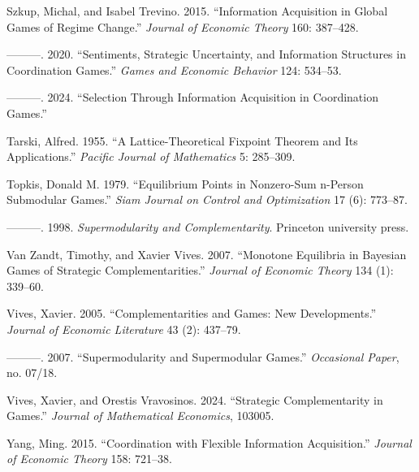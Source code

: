 \documentclass[
]{article}
\newlength{\cslhangindent}
\newenvironment{CSLReferences}[2] %
 {\begin{list}{}{%
  \setlength{\itemindent}{0pt}
  \setlength{\leftmargin}{0pt}
  \setlength{\parsep}{0pt}
  \ifodd #1
   \setlength{\leftmargin}{\cslhangindent}
   \setlength{\itemindent}{-1\cslhangindent}
  \fi
  \setlength{\itemsep}{#2\baselineskip}}}
 {\end{list}}
\theoremstyle{definition}
\theoremstyle{plain}
\theoremstyle{remark}
\begin{document}
\begin{CSLReferences}{1}{0}
Szkup, Michal, and Isabel Trevino. 2015. {``Information Acquisition in
Global Games of Regime Change.''} \emph{Journal of Economic Theory} 160:
387--428.

---------. 2020. {``Sentiments, Strategic Uncertainty, and Information
Structures in Coordination Games.''} \emph{Games and Economic Behavior}
124: 534--53.

---------. 2024. {``Selection Through Information Acquisition in
Coordination Games.''}

Tarski, Alfred. 1955. {``A Lattice-Theoretical Fixpoint Theorem and Its
Applications.''} \emph{Pacific Journal of Mathematics} 5: 285--309.

Topkis, Donald M. 1979. {``Equilibrium Points in Nonzero-Sum n-Person
Submodular Games.''} \emph{Siam Journal on Control and Optimization} 17
(6): 773--87.

---------. 1998. \emph{Supermodularity and Complementarity}. Princeton
university press.

Van Zandt, Timothy, and Xavier Vives. 2007. {``Monotone Equilibria in
Bayesian Games of Strategic Complementarities.''} \emph{Journal of
Economic Theory} 134 (1): 339--60.

Vives, Xavier. 2005. {``Complementarities and Games: New
Developments.''} \emph{Journal of Economic Literature} 43 (2): 437--79.

---------. 2007. {``Supermodularity and Supermodular Games.''}
\emph{Occasional Paper}, no. 07/18.

Vives, Xavier, and Orestis Vravosinos. 2024. {``Strategic
Complementarity in Games.''} \emph{Journal of Mathematical Economics},
103005.

Yang, Ming. 2015. {``Coordination with Flexible Information
Acquisition.''} \emph{Journal of Economic Theory} 158: 721--38.

\end{CSLReferences}

\newpage
\end{document}
